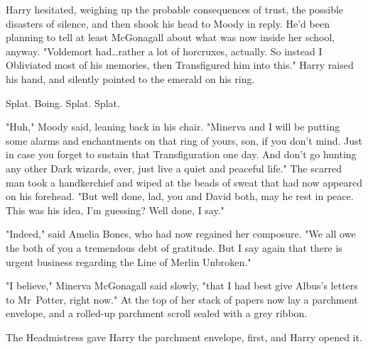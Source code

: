 Harry hesitated, weighing up the probable consequences of trust, the possible
disasters of silence, and then shook his head to Moody in reply. He'd been
planning to tell at least McGonagall about what was now inside her school,
anyway. "Voldemort had…rather a lot of horcruxes, actually. So instead
I Obliviated most of his memories, then Transfigured him into this." Harry
raised his hand, and silently pointed to the emerald on his ring.

Splat. Boing. Splat. Splat.

"Huh," Moody said, leaning back in his chair. "Minerva and I will be putting
some alarms and enchantments on that ring of yours, son, if you don't mind.
Just in case you forget to sustain that Transfiguration one day. And don't go
hunting any other Dark wizards, ever, just live a quiet and peaceful life." The
scarred man took a handkerchief and wiped at the beads of sweat that had now
appeared on his forehead. "But well done, lad, you and David both, may he rest
in peace. This was his idea, I'm guessing? Well done, I say."

"Indeed," said Amelia Bones, who had now regained her composure. "We all owe
the both of you a tremendous debt of gratitude. But I say again that there is
urgent business regarding the Line of Merlin Unbroken."

"I believe," Minerva McGonagall said slowly, "that I had best give Albus's
letters to Mr~Potter, right now." At the top of her stack of papers now lay a
parchment envelope, and a rolled-up parchment scroll sealed with a grey ribbon.

The Headmistress gave Harry the parchment envelope, first, and Harry opened it.
\later

